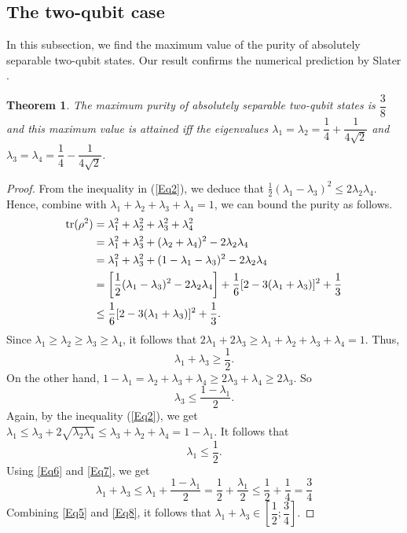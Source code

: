 \documentclass[reqno, 12pt,a4letter]{amsart}
\theoremstyle{definition}
\theoremstyle{plain}
\newtheorem {theorem}{Theorem}[section]
\begin{document}
\subsection{The two-qubit case}
In this subsection, we find the maximum value of the purity of absolutely separable two-qubit states. Our result confirms the numerical prediction by Slater \cite{Slater2009}.
\begin{theorem}\label{purity}
	The maximum purity of absolutely separable two-qubit states is $\dfrac{3}{8}$ and this maximum value is attained iff the  eigenvalues  $\lambda_1 = \lambda_2 = \dfrac{1}{4} + \dfrac{1}{4\sqrt{2}}$ and $\lambda_3 = \lambda_4=\dfrac{1}{4} - \dfrac{1}{4\sqrt{2}}$.
\end{theorem}
\begin{proof}
	From the inequality in (\ref{Eq2}), we deduce that $\frac{1}{2}(\lambda_1 - \lambda_3)^2\le 2\lambda_2\lambda_4$. Hence, combine with $\lambda_1 + \lambda_2 + \lambda_3 + \lambda_4 = 1$, we can bound the purity as follows.
	\begin{equation} \label{Eq4}
		\begin{aligned}
			{\rm tr}(\rho^2) &= \lambda_1^2 + \lambda_2^2 + \lambda_3^2 + \lambda_4^2\\ 
			&=\lambda_1^2 + \lambda_3^2 + (\lambda_2 + \lambda_4)^2 - 2\lambda_2\lambda_4\\
			&=\lambda_1^2 + \lambda_3^2 + (1 - \lambda_1 - \lambda_3)^2 - 2\lambda_2\lambda_4\\
			&= \left[\frac{1}{2}(\lambda_1 - \lambda_3)^2 - 2\lambda_2\lambda_4\right] + \frac{1}{6}[2 - 3(\lambda_1 + \lambda_3)]^2 + \frac{1}{3} \\
			&\le \frac{1}{6}[2 - 3(\lambda_1 + \lambda_3)]^2 + \frac{1}{3}. 
		\end{aligned}
	\end{equation}
	Since $\lambda_1 \ge \lambda_2\ge \lambda_3  \ge \lambda_4$, it follows that $2\lambda_1 + 2\lambda_3 \ge \lambda_1 + \lambda_2 + \lambda_3 + \lambda_4 = 1$. Thus, 
	\begin{equation}\label{Eq5}
		\lambda_1 + \lambda_3 \ge \frac{1}{2}.   	
	\end{equation}
	On the other hand, $1 - \lambda_1=\lambda_2 + \lambda_3 + \lambda_4 \ge 2\lambda_3 + \lambda_4 \ge 2\lambda_3$. So 
	\begin{equation}\label{Eq6}
		\lambda_3 \le \frac{1 - \lambda_1}{2}.	
	\end{equation}
	Again, by the inequality (\ref{Eq2}), we get $\lambda_1 \le \lambda_3 + 2\sqrt{\lambda_2\lambda_4} \le \lambda_3 + \lambda_2+\lambda_4 = 1 - \lambda_1$. It follows that 
	\begin{equation}\label{Eq7}
		\lambda_1 \le \frac{1}{2}.
	\end{equation}
	Using \eqref{Eq6} and \eqref{Eq7}, we get 
	\begin{equation}\label{Eq8}
		\lambda_1 + \lambda_3 \le \lambda_1 + \frac{1 - \lambda_1}{2} = \frac{1}{2} + \frac{\lambda_1}{2} \le \frac{1}{2} + \frac{1}{4} = \frac{3}{4}
	\end{equation}
	Combining \eqref{Eq5} and \eqref{Eq8}, it follows that $\lambda_1 + \lambda_3 \in \left[\dfrac{1}{2};\dfrac{3}{4}\right]$.
	

\end{proof}
\end{document}
